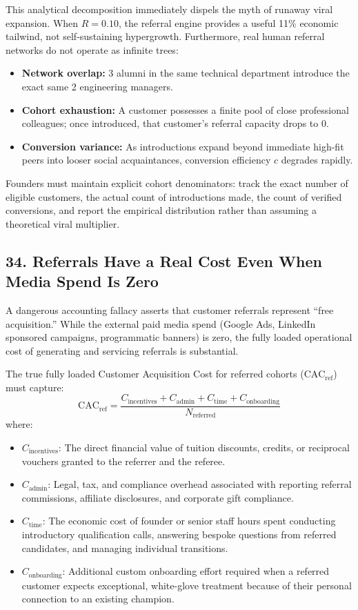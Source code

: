 This analytical decomposition immediately dispels the myth of runaway viral expansion. When $R = 0.10$, the referral engine provides a useful 11\% economic tailwind, not self-sustaining hypergrowth. Furthermore, real human referral networks do not operate as infinite trees:
\begin{itemize}[leftmargin=*]
\item \textbf{Network overlap:} 3 alumni in the same technical department introduce the exact same 2 engineering managers.
\item \textbf{Cohort exhaustion:} A customer possesses a finite pool of close professional colleagues; once introduced, that customer's referral capacity drops to 0.
\item \textbf{Conversion variance:} As introductions expand beyond immediate high-fit peers into looser social acquaintances, conversion efficiency $c$ degrades rapidly.
\end{itemize}

Founders must maintain explicit cohort denominators: track the exact number of eligible customers, the actual count of introductions made, the count of verified conversions, and report the empirical distribution rather than assuming a theoretical viral multiplier.

\subsection*{34. Referrals Have a Real Cost Even When Media Spend Is Zero}

A dangerous accounting fallacy asserts that customer referrals represent ``free acquisition.'' While the external paid media spend (Google Ads, LinkedIn sponsored campaigns, programmatic banners) is zero, the fully loaded operational cost of generating and servicing referrals is substantial.

The true fully loaded Customer Acquisition Cost for referred cohorts ($\text{CAC}_{\text{ref}}$) must capture:
\begin{equation}
\text{CAC}_{\text{ref}} = \frac{C_{\text{incentives}} + C_{\text{admin}} + C_{\text{time}} + C_{\text{onboarding}}}{N_{\text{referred}}}
\end{equation}
where:
\begin{itemize}[leftmargin=*]
\item $C_{\text{incentives}}$: The direct financial value of tuition discounts, credits, or reciprocal vouchers granted to the referrer and the referee.
\item $C_{\text{admin}}$: Legal, tax, and compliance overhead associated with reporting referral commissions, affiliate disclosures, and corporate gift compliance.
\item $C_{\text{time}}$: The economic cost of founder or senior staff hours spent conducting introductory qualification calls, answering bespoke questions from referred candidates, and managing individual transitions.
\item $C_{\text{onboarding}}$: Additional custom onboarding effort required when a referred customer expects exceptional, white-glove treatment because of their personal connection to an existing champion.
\end{itemize}

